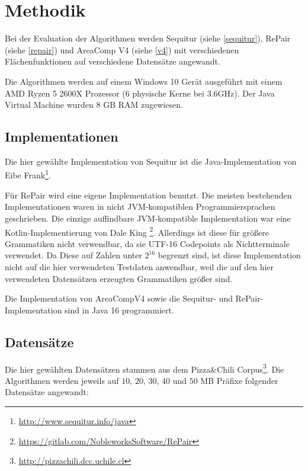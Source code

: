 \section{Methodik}

Bei der Evaluation der Algorithmen werden Sequitur (siehe \autoref{sequitur}), RePair (siehe \autoref{repair}) und AreaComp V4 (siehe \autoref{v4}) mit verschiedenen Flächenfunktionen auf verschiedene Datensätze angewandt.

Die Algorithmen werden auf einem Windows 10 Gerät ausgeführt mit einem AMD Ryzen 5 2600X Prozessor (6 physische Kerne bei 3.6GHz). Der Java Virtual Machine wurden 8 GB RAM zugewiesen.

\subsection{Implementationen}

Die hier gewählte Implementation von Sequitur ist die Java-Implementation von Eibe Frank\footnote{\url{http://www.sequitur.info/java}}. 

Für RePair wird eine eigene Implementation benutzt. Die meisten bestehenden Implementationen waren in nicht JVM-kompatiblen Programmiersprachen geschrieben. 
Die einzige auffindbare JVM-kompatible Implementation war eine Kotlin-Implementierung von Dale King \footnote{\url{https://gitlab.com/NobleworksSoftware/RePair}}. Allerdings ist diese für größere Grammatiken nicht verwendbar, da sie UTF-16 Codepoints als Nichtterminale verwendet. Da Diese auf Zahlen unter $2^{16}$ begrenzt sind, ist diese Implementation nicht auf die hier verwendeten Testdaten anwendbar, weil die auf den hier verwendeten Datensätzen erzeugten Grammatiken größer sind.

Die Implementation von AreaCompV4 sowie die Sequitur- und RePair-Implementation sind in Java 16 programmiert.

\subsection{Datensätze}
\label{datasets}

Die hier gewählten Datensätzen stammen aus dem Pizza\&Chili Corpus\footnote{\url{http://pizzachili.dcc.uchile.cl}}. Die Algorithmen werden jeweils auf $10$, $20$, $30$, $40$ und $50$ MB Präfixe folgender Datensätze angewandt:

